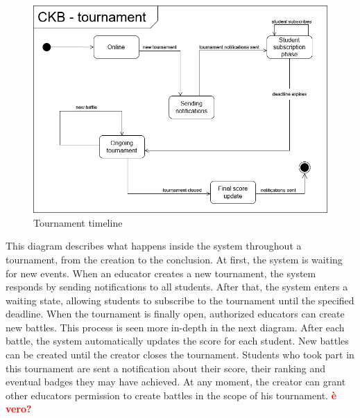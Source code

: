 \begin{figure}[H]
      \centering
      \includegraphics[scale=0.4]{src/state_diagrams/tournament_uml.png}
      \caption{Tournament timeline}
\end{figure} \vspace{1cm}
    This diagram describes what happens inside the system throughout a tournament, from the creation to the conclusion. At first, the system is waiting for new events. When an educator creates a new tournament, the system responds by sending notifications to all students. After that, the system enters a waiting state, allowing students to subscribe to the tournament until the specified deadline. When the tournament is finally open, authorized educators can create new battles. This process is seen more in-depth in the next diagram. After each battle, the system automatically updates the score for each student. New battles can be created until the creator closes the tournament. Students who took part in this tournament are sent a notification about their score, their ranking and eventual badges they may have achieved. At any moment, the creator can grant other educators permission to create battles in the scope of his tournament. \textcolor{red}{\textbf{è vero?}}\\


